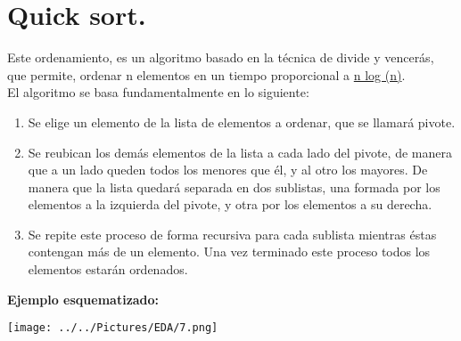 \documentclass[12pt,letterpaper]{report}
\begin{document}
\section*{Quick sort.}
Este ordenamiento, es un algoritmo basado en la técnica de divide y vencerás, que permite, ordenar n elementos en un tiempo proporcional a \underline{n log (n)}.\\
El algoritmo se basa fundamentalmente en lo siguiente: \\
\begin{enumerate}
	\item Se elige un elemento de la lista de elementos a ordenar, que se llamará pivote.
	\item Se reubican los demás elementos de la lista a cada lado del pivote, de manera que a un lado queden todos los menores que él, y al otro los mayores. De manera que la lista quedará separada en dos sublistas, una formada por los elementos a la izquierda del pivote, y otra por los elementos a su derecha.
	\item Se repite este proceso de forma recursiva para cada sublista mientras éstas contengan más de un elemento. Una vez terminado este proceso todos los elementos estarán ordenados.
\end{enumerate}
\textbf{Ejemplo esquematizado:}\\
\begin{center}
\texttt{[image: ../../Pictures/EDA/7.png]}  
\end{center}
\end{document}
